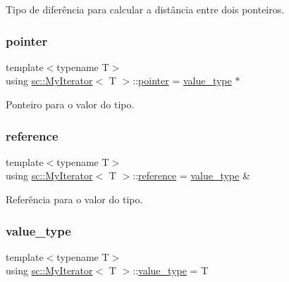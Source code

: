 Tipo de diferência para calcular a distância entre dois ponteiros. 

\mbox{\label{classsc_1_1MyIterator_aac55734d4d00af05ed90556dd8f8df0b}} 
\subsubsection{\texorpdfstring{pointer}{pointer}}
{\footnotesize\ttfamily template$<$typename T$>$ \\
using \hyperlink{classsc_1_1MyIterator}{sc\+::\+My\+Iterator}$<$ T $>$\+::\hyperlink{classsc_1_1MyIterator_aac55734d4d00af05ed90556dd8f8df0b}{pointer} =  \hyperlink{classsc_1_1MyIterator_a87259a3ccf8ff488d496b658324c4b2d}{value\+\_\+type} $\ast$}



Ponteiro para o valor do tipo. 

\mbox{\label{classsc_1_1MyIterator_a713949524e31c23eade8ea3521c938ef}} 
\subsubsection{\texorpdfstring{reference}{reference}}
{\footnotesize\ttfamily template$<$typename T$>$ \\
using \hyperlink{classsc_1_1MyIterator}{sc\+::\+My\+Iterator}$<$ T $>$\+::\hyperlink{classsc_1_1MyIterator_a713949524e31c23eade8ea3521c938ef}{reference} =  \hyperlink{classsc_1_1MyIterator_a87259a3ccf8ff488d496b658324c4b2d}{value\+\_\+type} \&}



Referência para o valor do tipo. 

\mbox{\label{classsc_1_1MyIterator_a87259a3ccf8ff488d496b658324c4b2d}} 
\subsubsection{\texorpdfstring{value\+\_\+type}{value\_type}}
{\footnotesize\ttfamily template$<$typename T$>$ \\
using \hyperlink{classsc_1_1MyIterator}{sc\+::\+My\+Iterator}$<$ T $>$\+::\hyperlink{classsc_1_1MyIterator_a87259a3ccf8ff488d496b658324c4b2d}{value\+\_\+type} =  T}

